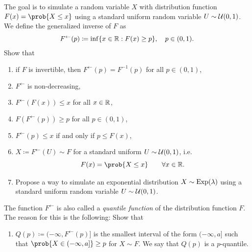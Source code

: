 \begin{exercise}[subtitle={Stochastic Simulation and Quantiles \Coffeecup\Coffeecup}]
    \label{ex: stochastic simulation}
    The goal is to simulate a random variable \(X\) with distribution 
    function \(F(x) = \prob{X \le x}\) using a standard uniform random variable
    \(U\sim \mathcal{U}(0,1)\). We define the generalized inverse of \(F\) as
    \[
        F^{\leftarrow}(p) \coloneq \inf\{x \in \mathbb{R} : F(x) \ge p\}, \quad p \in (0,1).
    \]
    Show that
    \begin{enumerate}[label=(\alph*), noitemsep]
        \item\label{it: quantile if invertible}
        if \(F\) is invertible, then \(F^{\leftarrow}(p) = F^{-1}(p)\) for all
        \(p \in (0,1)\),

        \item\label{it: monotonicity}
        \(F^{\leftarrow}\) is non-decreasing,

        \item\label{it: F-(F(x)) le x}
        \(F^{\leftarrow}(F(x)) \le x\) for all \(x \in \mathbb{R}\),

        \item\label{it: F(F-(p)) > p}
        \(F(F^{\leftarrow}(p)) \ge p\) for all \(p \in (0,1)\),

        \item\label{it: F-(p)< x iff p<F(x)} \(F^{\leftarrow}(p) \le x\) if and only if \(p \le F(x)\),

        \item\label{it: inverse transform sampling}
        \(X\coloneq F^{\leftarrow}(U) \sim F\) for a standard uniform \(U\sim \mathcal{U}(0,1)\), i.e.\ 
        \[
            F(x) = \prob{X \le x}
            \qquad \forall x \in \real.
        \]

        \item\label{it: simulate exponential rvs} Propose a way to simulate an exponential distribution \(X \sim
        \mathrm{Exp}(\lambda)\) using a standard uniform random variable \(U\sim
        \mathcal{U}(0,1)\).
    \end{enumerate}
    The function \(F^{\leftarrow}\) is also called a \emph{quantile function} of
    the distribution function \(F\). The reason for this is
    the following: Show that
    \begin{enumerate}[resume, label=(\alph*), noitemsep]
        \item\label{it: quantiles}
         \(Q(p) \coloneq (-\infty, F^{\leftarrow}(p)]\) is the smallest
        interval of the form \((-\infty, a]\) such that \(\prob{X \in (-\infty,
        a]} \ge p\) for \(X\sim F\). We say that \(Q(p)\) is a \(p\)-quantile.
    \end{enumerate}
\end{exercise}
